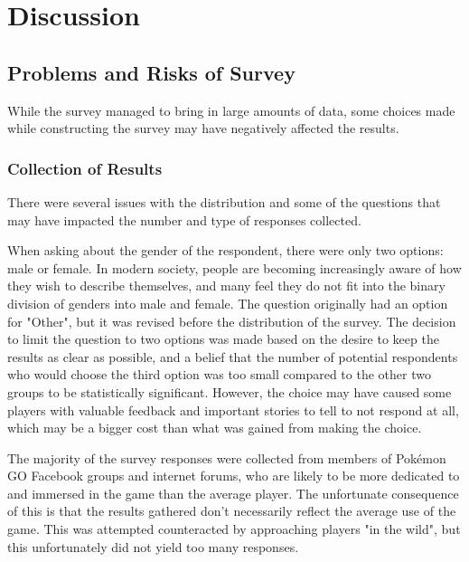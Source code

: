 
\chapter{Discussion}

\section{Problems and Risks of Survey}

While the survey managed to bring in large amounts of data, some choices made while constructing the survey may have negatively affected the results.

\subsection{Collection of Results}

There were several issues with the distribution and some of the questions that may have impacted the number and type of responses collected.

When asking about the gender of the respondent, there were only two options: male or female. In modern society, people are becoming increasingly aware of how they wish to describe themselves, and many feel they do not fit into the binary division of genders into male and female. The question originally had an option for "Other", but it was revised before the distribution of the survey. The decision to limit the question to two options was made based on the desire to keep the results as clear as possible, and a belief that the number of potential respondents who would choose the third option was too small compared to the other two groups to be statistically significant. However, the choice may have caused some players with valuable feedback and important stories to tell to not respond at all, which may be a bigger cost than what was gained from making the choice.

The majority of the survey responses were collected from members of Pokémon GO Facebook groups and internet forums, who are likely to be more dedicated to and immersed in the game than the average player. The unfortunate consequence of this is that the results gathered don't necessarily reflect the average use of the game. This was attempted counteracted by approaching players "in the wild", but this unfortunately did not yield too many responses.

